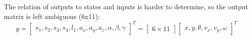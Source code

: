 \noindent The relation of outputs to states and inputs is harder to determine, so the output matrix is left ambiguous (6x11):
\[y =
\begin{bmatrix}
	s_1, s_2, s_3, s_4, l_1, a_x, a_y, a_z, \alpha, \beta, \gamma
\end{bmatrix}^T = 
\begin{bmatrix}
	6\times 11
\end{bmatrix}
\begin{bmatrix}
	x, y, \theta, v_x, v_y, \omega
\end{bmatrix}^T
\]


